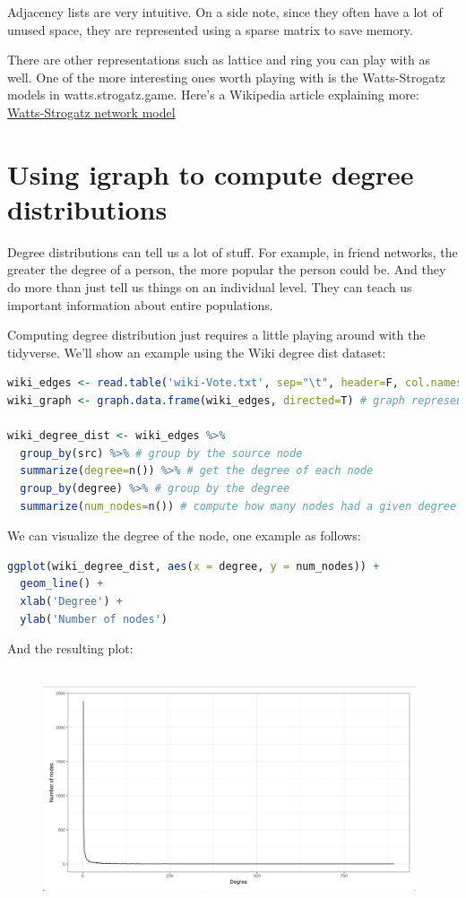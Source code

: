 Adjacency lists are very intuitive. On a side note, since they often have a lot of unused space, they are represented using a sparse matrix to save memory.

There are other representations such as lattice and ring you can play with as well. One of the more interesting ones worth playing with is the Watts-Strogatz models in watts.strogatz.game. Here's a Wikipedia article explaining more: \href{https://en.wikipedia.org/wiki/Watts\%E2\%80\%93Strogatz_model}{Watts-Strogatz network model}

\section{Using igraph to compute degree distributions}

Degree distributions can tell us a lot of stuff. For example, in friend networks, the greater the degree of a person, the more popular the person could be. And they do more than just tell us things on an individual level. They can teach us important information about entire populations.

Computing degree distribution just requires a little playing around with the tidyverse. We'll show an example using the Wiki degree dist dataset:

\begin{lstlisting}[language=R]
wiki_edges <- read.table('wiki-Vote.txt', sep="\t", header=F, col.names=c('src','dst'))
wiki_graph <- graph.data.frame(wiki_edges, directed=T) # graph representation

wiki_degree_dist <- wiki_edges %>%
  group_by(src) %>% # group by the source node
  summarize(degree=n()) %>% # get the degree of each node
  group_by(degree) %>% # group by the degree
  summarize(num_nodes=n()) # compute how many nodes had a given degree
\end{lstlisting}

We can visualize the degree of the node, one example as follows:

\begin{lstlisting}[language=R]
ggplot(wiki_degree_dist, aes(x = degree, y = num_nodes)) +
  geom_line() + 
  xlab('Degree') +
  ylab('Number of nodes')
\end{lstlisting}

And the resulting plot:

\begin{figure}[h]
\includegraphics[width=11cm, height=7cm]{img/node_deg.png}
\centering
\end{figure}

